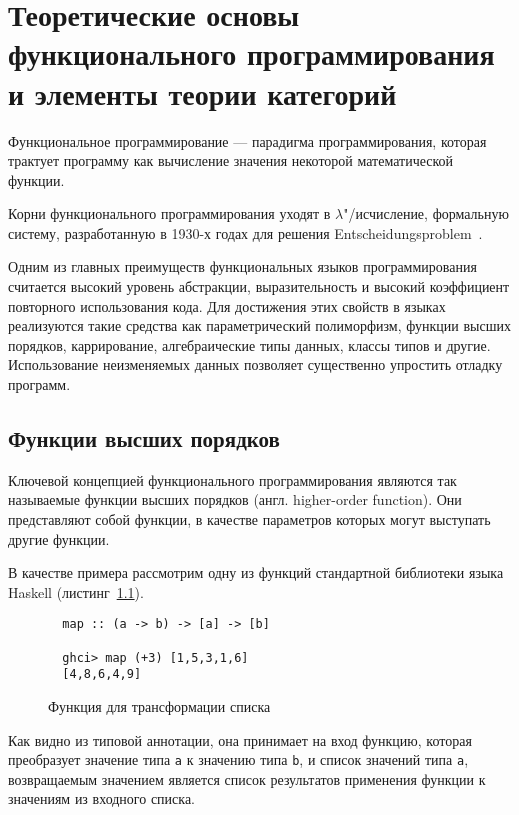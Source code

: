 
\chapter{Теоретические основы функционального программирования и элементы теории 
         категорий}

Функциональное программирование --- парадигма программирования, которая трактует 
программу как вычисление значения некоторой математической функции.

Корни функционального программирования уходят в $\lambda$"/исчисление,
формальную систему, разработанную в 1930-х годах для решения
Entscheidungsproblem~\cite{entscheidungsproblem}.

Одним из главных преимуществ функциональных языков программирования считается
высокий уровень абстракции, выразительность и высокий коэффициент повторного
использования кода. Для достижения этих свойств в языках реализуются такие
средства как параметрический полиморфизм, функции высших порядков, каррирование,
алгебраические типы данных, классы типов и другие. Использование неизменяемых
данных позволяет существенно упростить отладку программ.

\section{Функции высших порядков}
  
  Ключевой концепцией функционального программирования являются так называемые
  функции высших порядков (англ. higher-order function). Они представляют собой
  функции, в качестве параметров которых могут выступать другие функции.

  В качестве примера рассмотрим одну из функций стандартной библиотеки языка
  Haskell (листинг~\ref{listing:map}).

  \begin{figure}[h]
  \begin{lstlisting}
  map :: (a -> b) -> [a] -> [b]

  ghci> map (+3) [1,5,3,1,6]
  [4,8,6,4,9]
  \end{lstlisting}
  \caption{Функция для трансформации списка}
  \label{listing:map}
  \end{figure}

  Как видно из типовой аннотации, она принимает на вход функцию, которая преобразует
  значение типа \lstinline{a} к значению типа \lstinline{b}, и список значений
  типа \lstinline{a}, возвращаемым значением является список результатов
  применения функции к значениям из входного списка.

